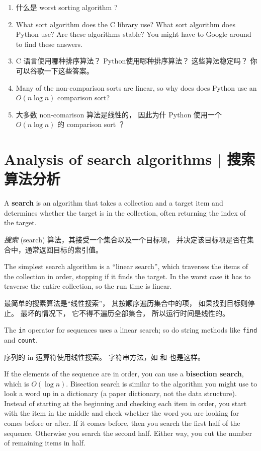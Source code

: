 \begin{exercise}
\begin{enumerate}
\item 什么是 worst sorting algorithm ?


\item What sort algorithm does the C library use?  What sort algorithm
  does Python use?  Are these algorithms stable?  You might have to
  Google around to find these answers.

\item C 语言使用哪种排序算法？ Python使用哪种排序算法？ 这些算法稳定吗？ 你可以谷歌一下这些答案。

\item Many of the non-comparison sorts are linear, so why does does
  Python use an $O(n \log n)$ comparison sort?

\item 大多数 non-comarison 算法是线性的， 因此为什 Python 使用一个 $O(n \log n)$ 的 comparison sort ？

\end{enumerate}

\end{exercise}


\section{Analysis of search algorithms  |  搜索算法分析}

A {\bf search} is an algorithm that takes a collection and a target
item and determines whether the target is in the collection, often
returning the index of the target.

{ \em 搜索} (search) 算法，其接受一个集合以及一个目标项，
并决定该目标项是否在集合中，通常返回目标的索引值。
  

The simplest search algorithm is a ``linear search'', which traverses
the items of the collection in order, stopping if it finds the target.
In the worst case it has to traverse the entire collection, so the run
time is linear.

最简单的搜素算法是``线性搜索''， 其按顺序遍历集合中的项， 如果找到目标则停止。 最坏的情况下， 它不得不遍历全部集合， 所以运行时间是线性的。

The {\tt in} operator for sequences uses a linear search; so do string
methods like {\tt find} and {\tt count}.

序列的 in 运算符使用线性搜索。 字符串方法，如  和  也是这样。

If the elements of the sequence are in order, you can use a {\bf
  bisection search}, which is $O(\log n)$.  Bisection search is
similar to the algorithm you might use to look a word up in a
dictionary (a paper dictionary, not the data structure).  Instead of
starting at the beginning and checking each item in order, you start
with the item in the middle and check whether the word you are looking
for comes before or after.  If it comes before, then you search the
first half of the sequence.  Otherwise you search the second half.
Either way, you cut the number of remaining items in half.

